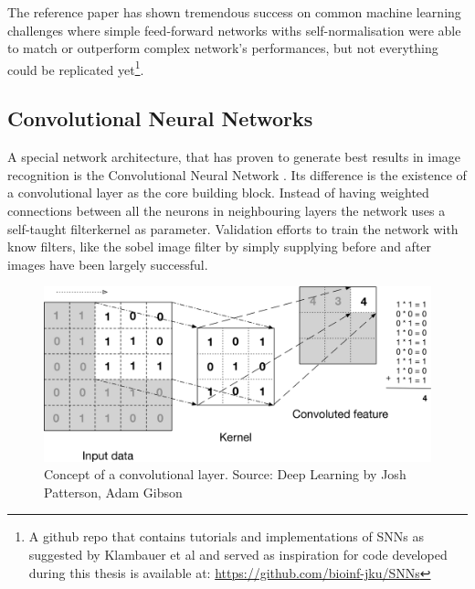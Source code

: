 The reference paper has shown tremendous success on common machine learning challenges where simple feed-forward networks withs self-normalisation were able to match or outperform complex network's performances, but not everything could be replicated yet\footnote{A  github repo that contains tutorials and implementations of SNNs as suggested by Klambauer et al and served as inspiration for code developed during this thesis is available at: \url{https://github.com/bioinf-jku/SNNs}}.


\subsection{Convolutional Neural Networks}



A special network architecture, that has proven to generate best results in image recognition is the Convolutional Neural Network \cite{Lecun98gradient-basedlearning}.
Its difference is the existence of a convolutional layer as the core building block.
Instead of having weighted connections between all the neurons in neighbouring layers the network uses a self-taught filterkernel as parameter. Validation efforts to train the network with know filters, like the sobel image filter by simply supplying before and after images have been largely successful.



\begin{figure}[h]
    \centering
	\includegraphics[width=.7\textwidth]{./images/illustrations/cnn}
    \caption{Concept of a convolutional layer. Source: Deep Learning by Josh Patterson, Adam Gibson}
    \label{fig:cnn}
\end{figure}





